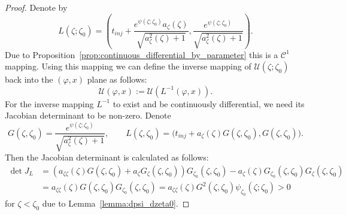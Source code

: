 \documentclass[10pt,a4paper]{amsart}
\begin{document}
\begin{proof}
Denote by
\[
L(\zeta; \zeta_0) = \left(t_{inj} + \frac{e^{\psi(\zeta; \zeta_0)}a_\zeta(\zeta)}{\sqrt{a_\zeta^2(\zeta) + 1}}, \frac{e^{\psi(\zeta; \zeta_0)}}{\sqrt{a_\zeta^2(\zeta) + 1}}\right).
\]
Due to Proposition~\ref{prop:continuous_differential_by_parameter} this is a $\mathcal C^1$ mapping. Using this mapping we can define the inverse mapping of $\mathcal U(\zeta; \zeta_0)$ back into the $(\varphi, x)$ plane as follows:
\[
\mathcal U(\varphi, x) := \mathcal U(L^{-1}(\varphi, x)).
\]
For the inverse mapping $L^{-1}$ to exist and be continuously differential, we need its Jacobian determinant to be non-zero. Denote
\[
G(\zeta, \zeta_0) = \frac{e^{\psi(\zeta; \zeta_0)}}{\sqrt{a_\zeta^2(\zeta) + 1}}, \qquad
L(\zeta, \zeta_0) = \Big(t_{inj} + a_\zeta(\zeta)G(\zeta, \zeta_0), G(\zeta, \zeta_0)\Big).
\]
Then the Jacobian determinant is calculated as follows:
\begin{align*}
\det J_L &= (a_{\zeta\zeta}(\zeta) G(\zeta, \zeta_0) + a_{\zeta} G_\zeta(\zeta, \zeta_0)) G_{\zeta_0}(\zeta, \zeta_0) - a_\zeta(\zeta) G_{\zeta_0}(\zeta, \zeta_0) G_\zeta(\zeta, \zeta_0) \\
{} &= a_{\zeta\zeta}(\zeta) G(\zeta, \zeta_0) G_{\zeta_0}(\zeta, \zeta_0) = a_{\zeta\zeta}(\zeta) G^2(\zeta, \zeta_0) \psi_{\zeta_0}(\zeta; \zeta_0) > 0
\end{align*}
for $\zeta<\zeta_0$ due to Lemma~\ref{lemma:dpsi_dzeta0}.
\end{proof}
\end{document}
